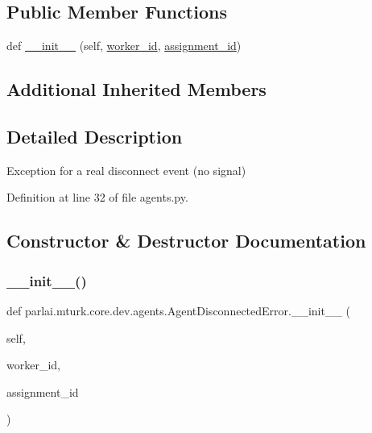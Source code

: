 \subsection*{Public Member Functions}
\begin{DoxyCompactItemize}
\item 
def \hyperlink{classparlai_1_1mturk_1_1core_1_1dev_1_1agents_1_1AgentDisconnectedError_a4a25d21dfcd5e987b5843226cfe586c1}{\+\_\+\+\_\+init\+\_\+\+\_\+} (self, \hyperlink{classparlai_1_1mturk_1_1core_1_1dev_1_1agents_1_1AbsentAgentError_a26db50c87a5d4954907d538de3da875c}{worker\+\_\+id}, \hyperlink{classparlai_1_1mturk_1_1core_1_1dev_1_1agents_1_1AbsentAgentError_ab9cf020196d28024b307c41a3fff6be1}{assignment\+\_\+id})
\end{DoxyCompactItemize}
\subsection*{Additional Inherited Members}


\subsection{Detailed Description}
\begin{DoxyVerb}Exception for a real disconnect event (no signal)
\end{DoxyVerb}
 

Definition at line 32 of file agents.\+py.



\subsection{Constructor \& Destructor Documentation}
\mbox{\label{classparlai_1_1mturk_1_1core_1_1dev_1_1agents_1_1AgentDisconnectedError_a4a25d21dfcd5e987b5843226cfe586c1}} 
\subsubsection{\texorpdfstring{\+\_\+\+\_\+init\+\_\+\+\_\+()}{\_\_init\_\_()}}
{\footnotesize\ttfamily def parlai.\+mturk.\+core.\+dev.\+agents.\+Agent\+Disconnected\+Error.\+\_\+\+\_\+init\+\_\+\+\_\+ (\begin{DoxyParamCaption}\item[{}]{self,  }\item[{}]{worker\+\_\+id,  }\item[{}]{assignment\+\_\+id }\end{DoxyParamCaption})}



